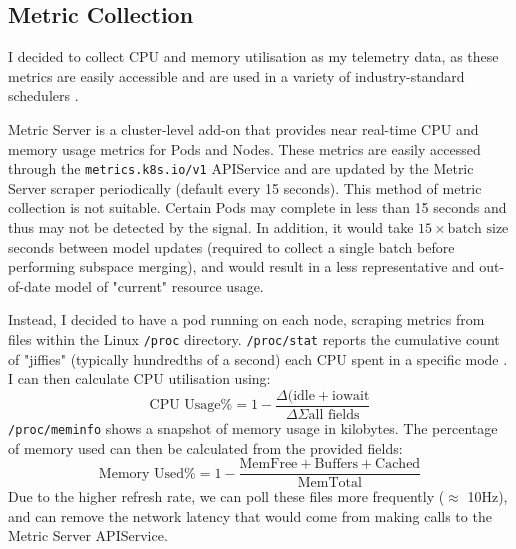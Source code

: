 \subsection{Metric Collection}
I decided to collect CPU and memory utilisation as my telemetry data, as these
metrics are easily accessible and are used in a variety of industry-standard
schedulers \cite{hadoop2016apache,sahasrabudhe_improved_2015}.

Metric Server is a cluster-level add-on that provides near real-time CPU and
memory usage metrics for Pods and Nodes. These metrics are easily accessed through
the \verb|metrics.k8s.io/v1| APIService and are updated by the Metric Server scraper
periodically (default every 15 seconds). This method of metric collection is not
suitable. Certain Pods may complete in less than 15 seconds and thus may not
be detected by the signal. In addition, it would take $15 \times \text{batch size}$
seconds between model updates (required to collect a single
batch before performing subspace merging), and would result in a less
representative and out-of-date model of "current" resource usage.

Instead, I decided to have a pod running on each node, scraping
metrics from files within the Linux \verb|/proc| directory.
\verb|/proc/stat| reports the cumulative count of "jiffies" (typically
hundredths of a second) each CPU spent in a specific mode \cite{proc_stat5}.
I can then calculate CPU utilisation using:
\[ \text{CPU Usage\%} = 1 - \frac{\Delta(\text{idle} +
\text{iowait}}{\Delta{\Sigma \text{all fields}}} \]
\verb|/proc/meminfo| shows a snapshot of memory usage in kilobytes. The
percentage of memory used can then be calculated from the provided fields:
\[ \text{Memory Used\%} = 1 - \frac{\text{MemFree} +
\text{Buffers} + \text{Cached}}{\text{MemTotal}}\]
Due to the higher refresh rate, we can poll these files more frequently
($\approx$ 10Hz), and can remove the network latency that would come from
making calls to the Metric Server APIService.


